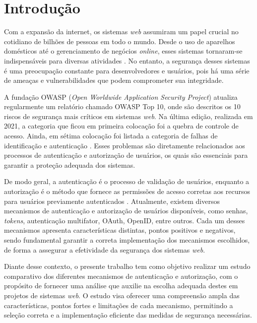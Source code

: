 \section{Introdução}

Com a expansão da internet, os sistemas \emph{web} assumiram um papel crucial no cotidiano de bilhões de
pessoas em todo o mundo. Desde o uso de aparelhos domésticos até o gerenciamento de 
negócios \emph{online}, esses sistemas tornaram-se indispensáveis para diversas atividades 
\cite{GREENGARD2015}. No entanto, a segurança desses sistemas é uma preocupação constante para 
desenvolvedores e usuários, pois há uma série de ameaças e vulnerabilidades que podem comprometer 
sua integridade.

A fundação OWASP (\emph{Open Worldwide Application Security Project}) atualiza regularmente um
relatório chamado OWASP Top 10, onde são descritos os 10 riscos de segurança mais críticos em
sistemas \emph{web}. Na última edição, realizada em 2021, a categoria que ficou em primeira colocação foi
a quebra de controle de acesso. Ainda, em sétima colocação foi listada a categoria de falhas de identificação e
autenticação \cite{OWASP2021}. Esses problemas são diretamente relacionados aos processos de
autenticação e autorização de usuários, os quais são essenciais para garantir a proteção adequada
dos sistemas.

De modo geral, a autenticação é o processo de validação de usuários, enquanto a autorização é o
método que fornece as permissões de acesso corretas aos recursos para usuários previamente
autenticados \cite{TUMIN2012}. Atualmente, existem diversos mecanismos de autenticação e autorização
de usuários disponíveis, como senhas, \emph{tokens}, autenticação multifator, OAuth, OpenID, entre
outros. Cada um desses mecanismos apresenta características distintas, pontos positivos e negativos,
sendo fundamental garantir a correta implementação dos mecanismos escolhidos, de forma a assegurar
a efetividade da segurança dos sistemas \emph{web}.

Diante desse contexto, o presente trabalho tem como objetivo realizar um estudo
comparativo dos diferentes mecanismos de autenticação e autorização, com o propósito
de fornecer uma análise que auxilie na escolha adequada destes em projetos de 
sistemas \emph{web}. O estudo visa oferecer uma compreensão ampla das
características, pontos fortes e limitações de cada mecanismo, permitindo a seleção
correta e a implementação eficiente das medidas de segurança necessárias.